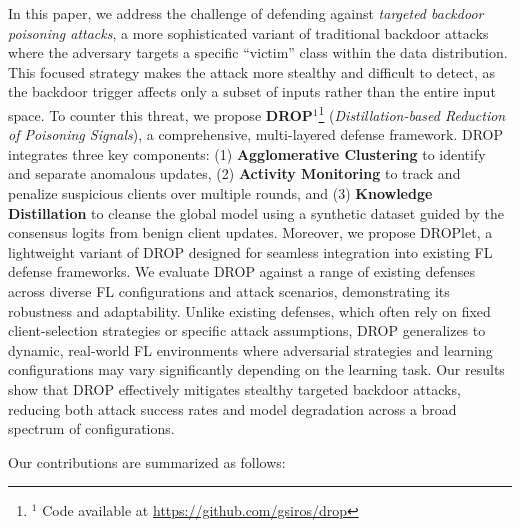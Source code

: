 In this paper, we address the challenge of defending against \textit{targeted backdoor poisoning attacks}, a more sophisticated variant of traditional backdoor attacks where the adversary targets a specific ``victim'' class within the data distribution. This focused strategy makes the attack more stealthy and difficult to detect, as the backdoor trigger affects only a subset of inputs rather than the entire input space. To counter this threat, we propose \textbf{DROP}$^1$\footnote{$^1$ Code available at \url{https://github.com/gsiros/drop}} (\textit{Distillation-based Reduction of Poisoning Signals}), a comprehensive, multi-layered defense framework. DROP integrates three key components: (1) \textbf{Agglomerative Clustering} to identify and separate anomalous updates, (2) \textbf{Activity Monitoring} to track and penalize suspicious clients over multiple rounds, and (3) \textbf{Knowledge Distillation} to cleanse the global model using a synthetic dataset guided by the consensus logits from benign client updates. Moreover, we propose DROPlet, a lightweight variant of DROP designed for seamless integration into existing FL defense frameworks.  We evaluate DROP against a range of existing defenses across diverse FL configurations and attack scenarios, demonstrating its robustness and adaptability. Unlike existing defenses, which often rely on fixed client-selection strategies or specific attack assumptions, DROP generalizes to dynamic, real-world FL environments where adversarial strategies and learning configurations may vary significantly depending on the learning task. Our results show that DROP effectively mitigates stealthy targeted backdoor attacks, reducing both attack success rates and model degradation across a broad spectrum of configurations.

Our contributions are summarized as follows:  

